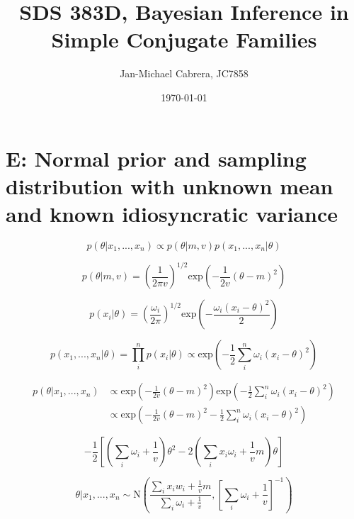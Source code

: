 \documentclass[12pt]{article}
\begin{document}
    \title{SDS 383D, Bayesian Inference in Simple Conjugate Families}
    \author{Jan-Michael Cabrera, JC7858}
    \date{\today}
    \maketitle

    \section*{E: Normal prior and sampling distribution with unknown mean and known idiosyncratic variance}

        \begin{equation}
              p(\theta|x_1,..., x_n) \propto p(\theta|m,v)p(x_1,...,x_n|\theta)
        \end{equation}

        \begin{equation}
              p(\theta|m,v) = \left(\frac{1}{2 \pi v} \right )^{1/2} \text{exp}\left( - \frac{1}{2v} (\theta - m)^2\right )
        \end{equation}

        \begin{equation}
              p(x_i|\theta) = \left(\frac{\omega_i}{2 \pi} \right )^{1/2} \text{exp}\left( - \frac{\omega_i(x_i - \theta)^2}{2} \right )
        \end{equation}

        \begin{equation}
              p(x_1,...,x_n|\theta) = \prod_i^n p(x_i|\theta) \propto \text{exp}\left( - \frac{1}{2} \sum_i^n\omega_i(x_i - \theta)^2 \right )
        \end{equation}

        \begin{align}
            p(\theta|x_1,...,x_n) &\propto \text{exp}\left( - \frac{1}{2v} (\theta - m)^2\right) \text{exp}\left( - \frac{1}{2} \sum_i^n\omega_i(x_i - \theta)^2\right)\\
            &\propto \text{exp}\left(-\frac{1}{2v}(\theta - m)^2 - \frac{1}{2} \sum_i^n\omega_i(x_i - \theta)^2\right)
        \end{align}

        \begin{equation}
            -\frac{1}{2} \left[ \left(\sum_i \omega_i + \frac{1}{v} \right) \theta^2 - 2 \left ( \sum_i x_i \omega_i + \frac{1}{v}m\right) \theta\right]
        \end{equation}

        \begin{equation}
            \theta|x_1,...,x_n \sim \text{N}\left( \frac{\sum_i x_i w_i + \frac{1}{v}m}{\sum_i \omega_i + \frac{1}{v}}, \left [ \sum_i \omega_i + \frac{1}{v}\right]^{-1}\right)
        \end{equation}
\end{document}
